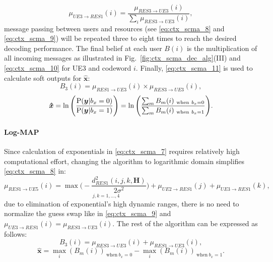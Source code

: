 \begin{equation}
  \label{eq:ctx_scma_9}
  \mu_{UE3 \rightarrow RES1}(i) = \frac{\mu_{RES3 \rightarrow UE3}(i)}
  {\sum_i\mu_{RES3 \rightarrow UE3}(i)},
\end{equation}
message passing between users and resources (see \eqref{eq:ctx_scma_8} and
\eqref{eq:ctx_scma_9}) will be repeated three to eight times to reach the
desired decoding performance. The final belief at each user $B(i)$ is the
multiplication of all incoming messages as illustrated in
Fig.~{\ref{fig:ctx_scma_dec_alg}}(III) and \eqref{eq:ctx_scma_10} for UE3 and
codeword $i$. Finally, \eqref{eq:ctx_scma_11} is used to calculate soft outputs
for $\bm{\hat{x}}$:
\begin{equation}
  \label{eq:ctx_scma_10}
  B_3(i) = \mu_{RES1 \rightarrow UE3}(i) \times \mu_{RES3 \rightarrow UE3}(i),
\end{equation}
\begin{equation}
  \label{eq:ctx_scma_11}
  \bm{\hat{x}} = \ln \Bigg( \frac{\operatorname{P}(\bm{y}|b_x=0)}{\operatorname{P}(\bm{y}|b_x=1)} \Bigg) =
  \ln \Bigg( \frac{\sum_m B_m(i)_{~\text{when}~b_x=0}}{\sum_m B_m(i)_{~\text{when}~b_x=1}}
  \Bigg).
\end{equation}

\paragraph{Log-MAP}
\label{sec:ctx_scma_log-map}

Since calculation of exponentials in \eqref{eq:ctx_scma_7} requires relatively
high computational effort, changing the algorithm to logarithmic domain
simplifies \eqref{eq:ctx_scma_8} in:
\begin{equation}
  \label{eq:ctx_scma_13}
  \mu_{RES1 \rightarrow UE5}(i) = \underset{j,k=1,...,4}
  {\max \Bigg(-\frac{d_{RES1}^2(i,j,k,\bm{H})}{2\sigma^2} \Bigg)} +
  \mu_{UE2 \rightarrow RES1}(j) + \mu_{UE3 \rightarrow RES1}(k),
\end{equation}
due to elimination of exponential's high dynamic ranges, there is no need to
normalize the guess swap like in \eqref{eq:ctx_scma_9} and
$\mu_{UE3 \rightarrow RES1}(i) = \mu_{RES3 \rightarrow UE3}(i).$
The rest of the algorithm can be expressed as follows:
\begin{equation}
  \label{eq:ctx_scma_15}
  B_3(i) = \mu_{RES3 \rightarrow UE3}(i) + \mu_{RES1 \rightarrow UE3}(i),
\end{equation}
\begin{equation}
  \label{eq:ctx_scma_16}
  \bm{\hat{x}} = \max_i(B_m(i))_{~\text{when}~b_x=0} - \max_i(B_m(i))_{~\text{when}~b_x=1}.
\end{equation}

